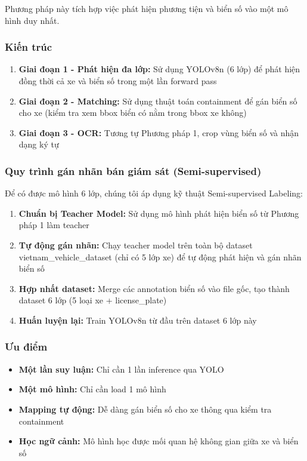 Phương pháp này tích hợp việc phát hiện phương tiện và biển số vào một mô hình duy nhất.

\subsubsection{Kiến trúc}
\begin{enumerate}
    \item \textbf{Giai đoạn 1 - Phát hiện đa lớp:} Sử dụng YOLOv8n (6 lớp) để phát hiện đồng thời cả xe và biển số trong một lần forward pass
    \item \textbf{Giai đoạn 2 - Matching:} Sử dụng thuật toán containment để gán biển số cho xe (kiểm tra xem bbox biển có nằm trong bbox xe không)
    \item \textbf{Giai đoạn 3 - OCR:} Tương tự Phương pháp 1, crop vùng biển số và nhận dạng ký tự
\end{enumerate}

\subsubsection{Quy trình gán nhãn bán giám sát (Semi-supervised)}
Để có được mô hình 6 lớp, chúng tôi áp dụng kỹ thuật Semi-supervised Labeling:
\begin{enumerate}
    \item \textbf{Chuẩn bị Teacher Model:} Sử dụng mô hình phát hiện biển số từ Phương pháp 1 làm teacher
    \item \textbf{Tự động gán nhãn:} Chạy teacher model trên toàn bộ dataset vietnam\_vehicle\_dataset (chỉ có 5 lớp xe) để tự động phát hiện và gán nhãn biển số
    \item \textbf{Hợp nhất dataset:} Merge các annotation biển số vào file gốc, tạo thành dataset 6 lớp (5 loại xe + license\_plate)
    \item \textbf{Huấn luyện lại:} Train YOLOv8n từ đầu trên dataset 6 lớp này
\end{enumerate}

\subsubsection{Ưu điểm}
\begin{itemize}
    \item \textbf{Một lần suy luận:} Chỉ cần 1 lần inference qua YOLO
    \item \textbf{Một mô hình:} Chỉ cần load 1 mô hình
    \item \textbf{Mapping tự động:} Dễ dàng gán biển số cho xe thông qua kiểm tra containment
    \item \textbf{Học ngữ cảnh:} Mô hình học được mối quan hệ không gian giữa xe và biển số
\end{itemize}

